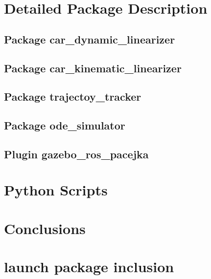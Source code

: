 \documentclass[12pt, letterpaper]{report}
\begin{document}
\chapter{Detailed Package Description}

\section{Package car\_dynamic\_linearizer}


\newpage

\section{Package car\_kinematic\_linearizer}


\newpage

\section{Package trajectoy\_tracker}


\newpage

\section{Package ode\_simulator}


\newpage

\section{Plugin gazebo\_ros\_pacejka}


\newpage

\chapter{Python Scripts}


\newpage

\chapter{Conclusions}


\appendix

\chapter{launch package inclusion}
	
\end{document}
